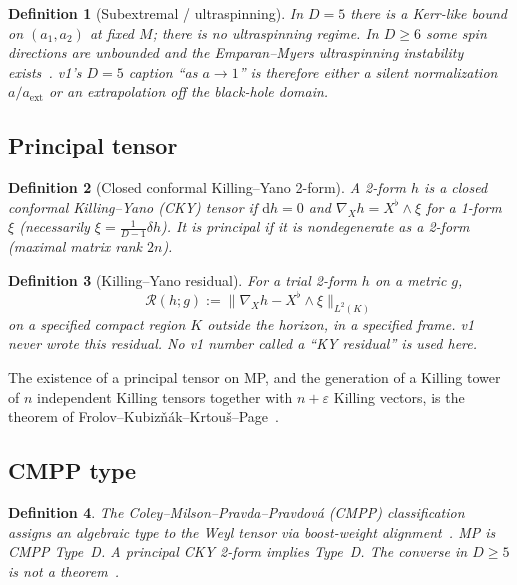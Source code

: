 \documentclass[11pt,a4paper]{article}
\newtheorem{definition}{Definition}[section]
\begin{document}
\begin{definition}[Subextremal / ultraspinning]
In \(D=5\) there is a Kerr-like bound on \((a_1,a_2)\) at fixed \(M\);
there is no ultraspinning regime. In \(D\ge6\) some spin directions are
unbounded and the Emparan--Myers ultraspinning instability
exists~\cite{EmparanMyers2003,DiasFiguerasMonteiroSantos2010}.
v1's \(D=5\) caption ``as \(a\to1\)'' is therefore either a silent
normalization \(a/a_{\mathrm{ext}}\) or an extrapolation off the
black-hole domain.
\end{definition}

\subsection{Principal tensor}

\begin{definition}[Closed conformal Killing--Yano 2-form]
A 2-form \(h\) is a \emph{closed conformal Killing--Yano} (CKY) tensor
if \(\mathrm{d}h=0\) and \(\nabla_X h=X^\flat\wedge\xi\) for a 1-form
\(\xi\) (necessarily \(\xi=\frac{1}{D-1}\delta h\)). It is
\emph{principal} if it is nondegenerate as a 2-form (maximal matrix
rank \(2n\)).
\end{definition}

\begin{definition}[Killing--Yano residual]
For a trial 2-form \(h\) on a metric \(g\),
\[
\mathcal{R}(h;g):=\bigl\|\nabla_X h-X^\flat\wedge\xi\bigr\|_{L^2(K)}
\]
on a specified compact region \(K\) outside the horizon, in a specified
frame. v1 never wrote this residual. No v1 number called a ``KY
residual'' is used here.
\end{definition}

The existence of a principal tensor on MP, and the generation of a
Killing tower of \(n\) independent Killing tensors together with
\(n+\varepsilon\) Killing vectors, is the theorem of
Frolov--Kubiz\v{n}\'ak--Krtou\v{s}--Page~\cite{FrolovKubiznak2007,Krtousetal2007,FrolovKrtousKubiznak2017}.

\subsection{CMPP type}

\begin{definition}
The Coley--Milson--Pravda--Pravdov\'a (CMPP) classification assigns an
algebraic type to the Weyl tensor via boost-weight
alignment~\cite{Coleyetal2004}. MP is CMPP Type~D. A principal CKY
2-form implies Type~D. The converse in \(D\ge5\) is not a
theorem~\cite{FrolovKrtousKubiznak2017}.
\end{definition}
\end{document}
